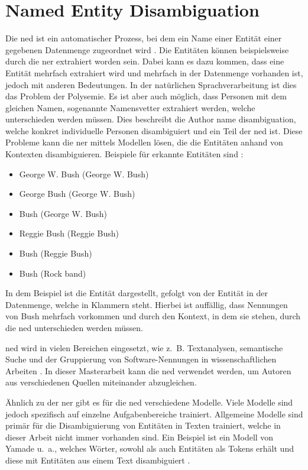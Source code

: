 \section{Named Entity Disambiguation}
\label{sec:author-name-disambiguation}
Die \gls{ned} ist ein automatischer Prozess, bei dem ein Name einer Entität einer gegebenen Datenmenge zugeordnet wird \autocites{cucerzan_large-scale_2007}{yamada_global_2022}.
Die Entitäten können beispielsweise durch die \gls{ner} extrahiert worden sein.
Dabei kann es dazu kommen, dass eine Entität mehrfach extrahiert wird und mehrfach in der Datenmenge vorhanden ist, jedoch mit anderen Bedeutungen.
In der natürlichen Sprachverarbeitung ist dies das Problem der Polysemie.
Es ist aber auch möglich, dass Personen mit dem gleichen Namen, sogenannte Namensvetter extrahiert werden, welche unterschieden werden müssen.
Dies beschreibt die Author name disambiguation, welche konkret individuelle Personen disambiguiert und ein Teil der \gls{ned} ist.
Diese Probleme kann die \gls{ner} mittels Modellen lösen, die die Entitäten anhand von Kontexten disambiguieren.
Beispiele für erkannte Entitäten sind \autocite{cucerzan_large-scale_2007}:

\begin{itemize}
  \item George W. Bush (George W. Bush)
  \item George Bush (George W. Bush)
  \item Bush (George W. Bush)
  \item Reggie Bush (Reggie Bush)
  \item Bush (Reggie Bush)
  \item Bush (Rock band)
\end{itemize}

In dem Beispiel ist die Entität dargestellt, gefolgt von der Entität in der Datenmenge, welche in Klammern steht.
Hierbei ist auffällig, dass Nennungen von \glqq Bush\grqq{} mehrfach vorkommen und durch den Kontext, in dem sie stehen, durch die \gls{ned} unterschieden werden müssen.

\gls{ned} wird in vielen Bereichen eingesetzt, wie z.~B. Textanalysen, semantische Suche und der Gruppierung von Software-Nennungen in wissenschaftlichen Arbeiten \autocites{cucerzan_large-scale_2007}{yamada_global_2022}{schindler_somesci-_2021}.
In dieser Masterarbeit kann die \gls{ned} verwendet werden, um Autoren aus verschiedenen Quellen miteinander abzugleichen.

Ähnlich zu der \gls{ner} gibt es für die \gls{ned} verschiedene Modelle.
Viele Modelle sind jedoch spezifisch auf einzelne Aufgabenbereiche trainiert.
Allgemeine Modelle sind primär für die Disambiguierung von Entitäten in Texten trainiert, welche in dieser Arbeit nicht immer vorhanden sind.
Ein Beispiel ist ein Modell von Yamade u.~a., welches Wörter, sowohl als auch Entitäten als Tokens erhält und diese mit Entitäten aus einem Text disambiguiert \autocite{yamada_global_2022}.
